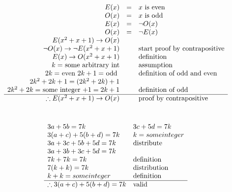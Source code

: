 \documentclass[letterpaper]{article}
\begin{document}
	\section{}
    	\begin{displaymath}
    		\begin{array}{rll}
    			E(x) &=& x $ is even$\\
                O(x) &=& x $ is odd$\\
                E(x) &=& \neg O(x)\\
                O(x) &=& \neg E(x)\\
                E(x^2 + x + 1) \rightarrow O(x) &&\\
                \neg O(x) \rightarrow \neg E(x^2 + x + 1) && $start proof by contrapositive$\\
                E(x) \rightarrow O(x^2 + x + 1) && $definition$\\
                k = $ some arbitrary int$ && $assumption$\\
                2k = $ even $ 2k + 1 = $ odd $ && $definition of odd and even$\\
               	2k^2 + 2k + 1 = (2k^2 + 2k) + 1 &&\\
                2k^2 + 2k = $ some integer $ + 1 = 2k + 1 && $definition of odd$\\
                \hline
                \therefore E(x^2 + x + 1) \rightarrow O(x) && $proof by contrapositive$\\
    		\end{array}
    	\end{displaymath}
	\section{}
    	\begin{displaymath}
    		\begin{array}{ll}
            	3a + 5b = 7k & 3c + 5d = 7k\\
                3(a + c) + 5(b + d) = 7k & k = some integer\\
                3a + 3c + 5b + 5d = 7k & $distribute$\\
                3a + 3b + 3c + 5d = 7k & \\
                7k + 7k = 7k & $definition$\\
                7(k + k) = 7k & $distribution$\\
                k + k = some integer & $definition$\\
                \hline
                \therefore 3(a + c) + 5(b+d) = 7k & $valid$\\
    		\end{array}
    	\end{displaymath}
\end{document}
